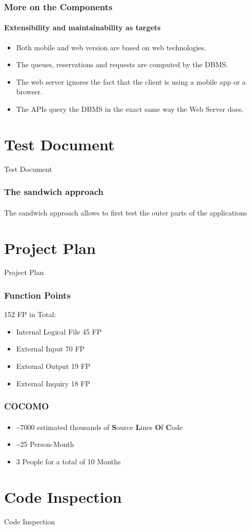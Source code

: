 \documentclass[10pt,xcolor={usenames,dvipsnames}]{beamer}
\begin{document}
\begin{frame}
	\frametitle{More on the Components}
	\framesubtitle{Extensibility and maintainability as targets}
	\begin{itemize}
		\item Both mobile and web version are based on web technologies.
		\item The queues, reservations and requests are computed by the DBMS.
		\item The web server ignores the fact that the client is using a mobile app or a browser.
		\item The APIs query the DBMS in the exact same way the Web Server does.
	\end{itemize}
\end{frame}

\section[Section]{Test Document}
\begin{frame}
	\begin{center}
		Test Document	
	\end{center}
\end{frame}
\begin{frame}
	\frametitle{The sandwich approach}
	\framesubtitle{}
	The sandwich approach allows to first test the outer parts of the applications
\end{frame}

\section[Section]{Project Plan}
\begin{frame}
	\begin{center}
		Project Plan
	\end{center}
\end{frame}
\begin{frame}
	\frametitle{Function Points}
	152 FP in Total:
	\begin{itemize}
		\item Internal Logical File 45 FP
		\item External Input 70 FP
		\item External Output 19 FP
		\item External Inquiry 18 FP
	\end{itemize}
\end{frame}
\begin{frame}
	\frametitle{COCOMO}
	\framesubtitle{}
	\begin{itemize}
		\item \textasciitilde7000 estimated thousands of \textbf{S}ource \textbf{L}ines \textbf{O}f \textbf{C}ode
		\item \textasciitilde25 Person-Month
		\item 3 People for a total of 10 Months
	\end{itemize}
\end{frame}

\section[Section]{Code Inspection}
\begin{frame}
	\begin{center}
		Code Inspection
	\end{center}
\end{frame}
\end{document}
